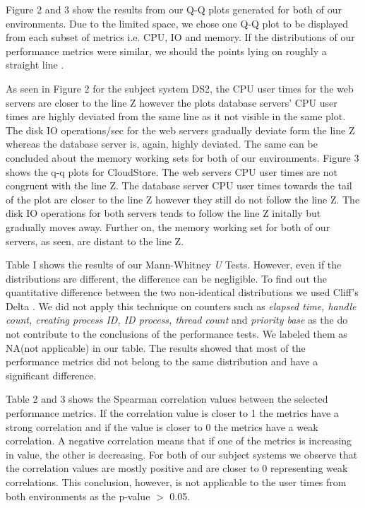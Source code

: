 Figure 2 and 3 show the results from our Q-Q plots generated for both of our environments. Due to the limited space, we chose one Q-Q plot to be displayed from each subset of metrics i.e. CPU, IO and memory. If the distributions of our performance metrics were similar, we should the points lying on roughly a straight line \cite{qq_plots}.

As seen in Figure 2 for the subject system DS2, the CPU user times for the web servers are closer to the line Z however the plots database servers' CPU user times are highly deviated from the same line as it not visible in the same plot. The disk IO operations/sec for the web servers gradually deviate form the line Z whereas the database server is, again, highly deviated. The same can be concluded about the memory working sets for both of our environments.
Figure 3 shows the q-q plots for CloudStore. The web servers CPU user times are not congruent with the line Z. The database server CPU user times towards the tail of the plot are closer to the line Z however they still do not follow the line Z. The disk IO operations for both servers tends to follow the line Z initally but gradually moves away. Further on, the memory working set for both of our servers, as seen, are distant to the line Z.

Table I shows the results of our Mann-Whitney \textit{U} Tests. However, even if the distributions are different, the difference can be negligible. To find out the quantitative difference between the two non-identical distributions  we used Cliff's Delta \cite{cliffsdeltajack}. We did not apply this technique on counters such as \textit{elapsed time, handle count, creating process ID, ID process, thread count} and \textit{priority base} as the do not contribute to the conclusions of the performance tests. We labeled them as NA(not applicable) in our table. The results showed that most of the performance metrics did not belong to the same distribution and have a significant difference.

Table 2 and 3 shows the Spearman correlation values between the selected performance metrics. If the correlation value is closer to 1 the metrics have a strong correlation and if the value is closer to 0 the metrics have a weak correlation. A negative correlation means that if one of the metrics is increasing in value, the other is decreasing. For both of our subject systems we observe that the correlation values are mostly positive and are closer to 0 representing weak correlations. This conclusion, however, is not applicable to the user times from both environments as the p-value $>$ 0.05.

